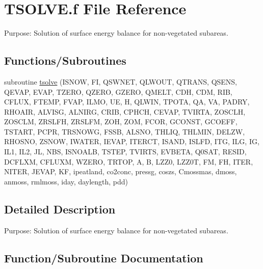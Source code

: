 \hypertarget{TSOLVE_8f}{}\section{T\+S\+O\+L\+V\+E.\+f File Reference}
\label{TSOLVE_8f}


Purpose\+: Solution of surface energy balance for non-\/vegetated subareas.  


\subsection*{Functions/\+Subroutines}
\begin{DoxyCompactItemize}
\item 
subroutine \hyperlink{TSOLVE_8f_a25bf2ca54264e7a9a28e831c5b75151e}{tsolve} (I\+S\+N\+O\+W, F\+I, Q\+S\+W\+N\+E\+T, Q\+L\+W\+O\+U\+T, Q\+T\+R\+A\+N\+S, Q\+S\+E\+N\+S, Q\+E\+V\+A\+P, E\+V\+A\+P, T\+Z\+E\+R\+O, Q\+Z\+E\+R\+O, G\+Z\+E\+R\+O, Q\+M\+E\+L\+T, C\+D\+H, C\+D\+M, R\+I\+B, C\+F\+L\+U\+X, F\+T\+E\+M\+P, F\+V\+A\+P, I\+L\+M\+O, U\+E, H, Q\+L\+W\+I\+N, T\+P\+O\+T\+A, Q\+A, V\+A, P\+A\+D\+R\+Y, R\+H\+O\+A\+I\+R, A\+L\+V\+I\+S\+G, A\+L\+N\+I\+R\+G, C\+R\+I\+B, C\+P\+H\+C\+H, C\+E\+V\+A\+P, T\+V\+I\+R\+T\+A, Z\+O\+S\+C\+L\+H, Z\+O\+S\+C\+L\+M, Z\+R\+S\+L\+F\+H, Z\+R\+S\+L\+F\+M, Z\+O\+H, Z\+O\+M, F\+C\+O\+R, G\+C\+O\+N\+S\+T, G\+C\+O\+E\+F\+F, T\+S\+T\+A\+R\+T, P\+C\+P\+R, T\+R\+S\+N\+O\+W\+G, F\+S\+S\+B, A\+L\+S\+N\+O, T\+H\+L\+I\+Q, T\+H\+L\+M\+I\+N, D\+E\+L\+Z\+W, R\+H\+O\+S\+N\+O, Z\+S\+N\+O\+W, I\+W\+A\+T\+E\+R, I\+E\+V\+A\+P, I\+T\+E\+R\+C\+T, I\+S\+A\+N\+D, I\+S\+L\+F\+D, I\+T\+G, I\+L\+G, I\+G, I\+L1, I\+L2, J\+L, N\+B\+S, I\+S\+N\+O\+A\+L\+B, T\+S\+T\+E\+P, T\+V\+I\+R\+T\+S, E\+V\+B\+E\+T\+A, Q0\+S\+A\+T, R\+E\+S\+I\+D, D\+C\+F\+L\+X\+M, C\+F\+L\+U\+X\+M, W\+Z\+E\+R\+O, T\+R\+T\+O\+P, A, B, L\+Z\+Z0, L\+Z\+Z0\+T, F\+M, F\+H, I\+T\+E\+R, N\+I\+T\+E\+R, J\+E\+V\+A\+P, K\+F, ipeatland, co2conc, pressg, coszs, Cmossmas, dmoss, anmoss, rmlmoss, iday, daylength, pdd)
\end{DoxyCompactItemize}


\subsection{Detailed Description}
Purpose\+: Solution of surface energy balance for non-\/vegetated subareas. 



\subsection{Function/\+Subroutine Documentation}
\hypertarget{TSOLVE_8f_a25bf2ca54264e7a9a28e831c5b75151e}{}
